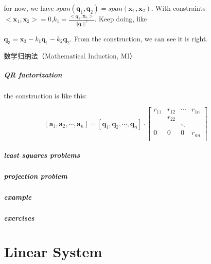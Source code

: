 \documentclass[UTF8]{../../09-Mathematics}
\begin{document}
for now, we have 
$span(\boldsymbol{q}_1,\boldsymbol{q}_2) =span(\boldsymbol{x}_1,\boldsymbol{x}_2) $. With constraints $<\boldsymbol{x}_1,\boldsymbol{x}_2>=0$,$k_1 = \frac{<\boldsymbol{q}_1,\boldsymbol{x}_n>}{||\boldsymbol{q}_1||^2}$. Keep doing, like 

$\boldsymbol{q}_3 = \boldsymbol{x}_3 - k_1 \boldsymbol{q}_1- k_2 \boldsymbol{q}_2$. From the construction, we can see it is right.


数学归纳法（Mathematical Induction, MI）

\paragraph{QR factorization}
the construction is like this:

$$
[\boldsymbol{a}_1,\boldsymbol{a}_2,\cdots, \boldsymbol{a}_n ]
=
[\boldsymbol{q}_1,\boldsymbol{q}_2,\cdots, \boldsymbol{q}_n ]
\cdot 
\begin{bmatrix}
    r_{11} &  r_{12} &\cdots & r_{1n}\\
    &  r_{22} & & \\
    &   &\ddots & \\
    0 & 0 & 0 &r_{nn}  \\
 \end{bmatrix}
$$
\paragraph{least squares problems}

\paragraph{projection problem}

\paragraph{example}

\paragraph{exercises}







\newpage
\chapter{Linear System}
\end{document}
